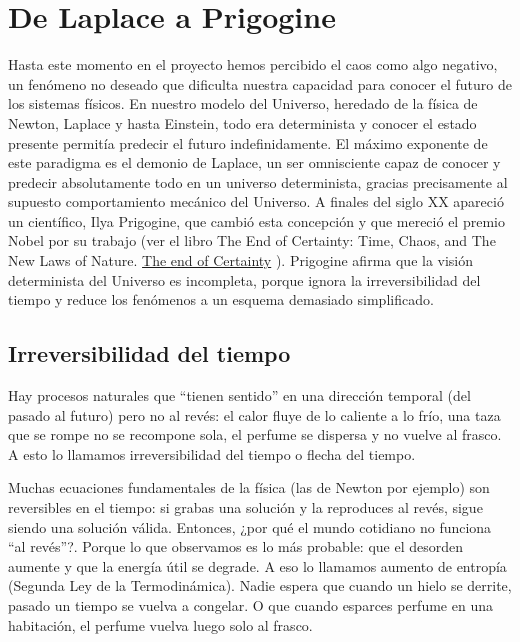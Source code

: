 \documentclass[
  10pt,
  a4paper,
  DIV=11,
  numbers=noendperiod,
  open=any]{scrreprt}
\numberwithin{equation}{chapter}
\numberwithin{equation}{section}
\renewcommand{\[}{\begin{equation}}
\renewcommand{\]}{\end{equation}}
\begin{document}
\chapter{De Laplace a Prigogine}\label{de-laplace-a-prigogine}

Hasta este momento en el proyecto hemos percibido el caos como algo
negativo, un fenómeno no deseado que dificulta nuestra capacidad para
conocer el futuro de los sistemas físicos. En nuestro modelo del
Universo, heredado de la física de Newton, Laplace y hasta Einstein,
todo era determinista y conocer el estado presente permitía predecir el
futuro indefinidamente. El máximo exponente de este paradigma es el demonio de Laplace, un ser omnisciente capaz de conocer y predecir absolutamente todo en un universo determinista, gracias precisamente al supuesto comportamiento mecánico del Universo.  A finales del siglo XX apareció un científico,
Ilya Prigogine, que cambió esta concepción y que mereció el premio Nobel
por su trabajo (ver el libro The End of Certainty: Time, Chaos, and The
New Laws of Nature.
\href{https://kremesti.com/portfolio/technical_writing/Academic_Research_Papers/End_of_Certainty.htm}{The
end of Certainty} ). Prigogine afirma que la visión determinista del
Universo es incompleta, porque ignora la irreversibilidad del tiempo y
reduce los fenómenos a un esquema demasiado simplificado.

\section{Irreversibilidad del tiempo}\label{irreversibilidad-del-tiempo}

Hay procesos naturales que ``tienen sentido'' en una dirección temporal
(del pasado al futuro) pero no al revés: el calor fluye de lo caliente a
lo frío, una taza que se rompe no se recompone sola, el perfume se
dispersa y no vuelve al frasco. A esto lo llamamos irreversibilidad del
tiempo o flecha del tiempo.

Muchas ecuaciones fundamentales de la física (las de Newton por ejemplo)
son reversibles en el tiempo: si grabas una solución y la reproduces al
revés, sigue siendo una solución válida. Entonces, ¿por qué el mundo
cotidiano no funciona ``al revés''?. Porque lo que observamos es lo más
probable: que el desorden aumente y que la energía útil se degrade. A
eso lo llamamos aumento de entropía (Segunda Ley de la Termodinámica).
Nadie espera que cuando un hielo se derrite, pasado un tiempo se vuelva
a congelar. O que cuando esparces perfume en una habitación, el perfume
vuelva luego solo al frasco.
\end{document}
